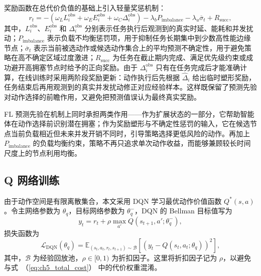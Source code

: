 奖励函数在总代价负值的基础上引入轻量奖惩机制：
\begin{equation}
    r_t = -\left(
    \omega_L L_i^{\mathrm{obs}}
    + \omega_E E_i^{\mathrm{obs}}
    + \omega_C \Delta_i^{\mathrm{obs}}
    \right)
    - \lambda_b P_{\mathrm{imbalance}}
    - \lambda_u \overline{\sigma}_t
    + R_{\mathrm{succ}},
    \label{eq:ch5_reward}
\end{equation}
其中，$L_i^{\mathrm{obs}}$、$E_i^{\mathrm{obs}}$ 和 $\Delta_i^{\mathrm{obs}}$ 分别表示任务执行后观测到的真实时延、能耗和并发扰动；$P_{\mathrm{imbalance}}$ 表示负载不均衡惩罚项，用于抑制任务长期集中到少数高性能边缘节点；$\overline{\sigma}_t$ 表示当前被选动作或候选动作集合上的平均预测不确定性，用于避免策略在高不确定区域过度激进；$R_{\mathrm{succ}}$ 为任务在截止期内完成、满足优先级约束或成功避开高拥塞节点时给予的正向奖励。由于 $\Delta_i^{\mathrm{obs}}$ 只有在任务完成后才能准确计算，在线训练时采用两阶段奖励更新：动作执行后先根据 $\widehat{\Delta}_i$ 给出临时塑形奖励，任务结束后再用观测到的真实并发扰动修正对应经验样本。这样既保留了预测先验对动作选择的前瞻作用，又避免把预测值误认为最终真实奖励。

FL 预测先验在机制上同时承担两类作用——作为扩展状态的一部分，它帮助智能体在动作选择前识别潜在拥塞；作为奖励塑形与不确定性惩罚的输入，它在候选节点当前负载相近但未来并发开销不同时，引导策略选择更低风险的动作。再加上 $P_{\mathrm{imbalance}}$ 的负载均衡约束，策略不再只追求单次动作收益，而能够兼顾较长时间尺度上的节点利用均衡。

\subsection{Q 网络训练}

由于动作空间是有限离散集合，本文采用 DQN 学习最优动作价值函数 $Q^*(s,a)$。令主网络参数为 $\theta_q$，目标网络参数为 $\theta_q^{-}$，DQN 的 Bellman 目标值写为
\begin{equation}
    y_t =
    r_t + \rho \max_{a'} Q(s_{t+1},a';\theta_q^-),
    \label{eq:ch5_bellman_target}
\end{equation}
损失函数为
\begin{equation}
    \mathcal{L}_{\mathrm{DQN}}(\theta_q) =
    \mathbb{E}_{(s_t,a_t,r_t,s_{t+1}) \sim \mathcal{B}}
    \left[
        \left(
        y_t - Q(s_t,a_t;\theta_q)
        \right)^2
        \right],
    \label{eq:ch5_dqn_loss}
\end{equation}
其中，$\mathcal{B}$ 为经验回放池，$\rho\in[0,1)$ 为折扣因子。这里将折扣因子记为 $\rho$，以避免与式~（\ref{eq:ch5_total_cost}） 中的代价权重混淆。


